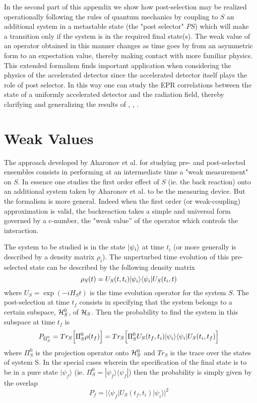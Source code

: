 \documentclass[12pt,oneside]{report}
\def\ket#1{|#1\rangle}
\def\bra#1{\langle #1|}
\newcommand{\bi}{\mbox{$ \bra{\psi_i} $}}
\begin{document}
In the second part of this appendix we show 
how  post-selection may be realized operationally following the rules of
quantum mechanics by coupling to $S$
an additional system in a metastable
state   (the "post selector" $PS$) which will make a transition only if the
system is in the required  final state(s).
The weak value of an operator obtained in this manner changes as time goes by
from an asymmetric form to an expectation value, thereby making contact with
more familiar physics. This extended formalism finds important application when
considering the physics of the accelerated detector since the accelerated
detector itself plays the role of post selector. In this way one can study the 
EPR correlations between the state of a uniformly accelerated detector and the
radiation field, thereby clarifying and generalizing the results of
\cite{UnWa}, \cite{AuMu}, \cite{Grow}.

\section{Weak Values}
The approach developed by
Aharonov et al.\cite{Ahar} for studying pre- and post-selected
ensembles
consists in performing at an intermediate time a "weak measurement"
on $S$. In
essence one studies the first order 
effect of $S$ (ie. the back reaction) onto an
additional system
taken  by Aharonov et al. to be the measuring device. But the formalism is
more general. Indeed
when the first order (or weak-coupling)  approximation is
valid, the backreaction takes a simple and universal form governed by  a
c-number, the "weak value'' of the operator which controls the interaction.


The system to be studied is in the state $\ki$ at
time $t_i$ (or 
 more generally is described by a density matrix $\rho_i$).
The unperturbed time
evolution of this pre-selected state
 can be described by the following density matrix
\begin{equation} \rho_S(t) = U_S(t,t_i)\ki \bi U_S(t_i,t) \label{weaki}
\end{equation}  where $U_S = \exp (- i H_S t)$ is the time evolution operator
for the system $S$. The post-selection at time $t_f$ consists in specifying
that the system belongs to a certain subspace, ${\cal H}_S^{0}$, of
${\cal H}_S$.
Then the probability to find the system in
this subspace at time $t_f$ is \begin{equation}
P_{\Pi_S^{0}} = Tr_S \Bigl [ \Pi_S^{0} \rho(t_f) \Bigr] = Tr_S \Bigl[
\Pi_S^{0} U_S(t_f,t_i)\ki \bi U_S(t_i,t_f) \Bigr] \label{weakii}
\end{equation}   where
$\Pi_S^{0}$ is the projection operator onto ${\cal H}_S^0$ and $Tr_S$ is
the trace over the states of system S. 
In the special cases wherein the specification 
of the final state is to be in a pure state $\ket{\psi_f}$ (ie. 
$\Pi_S^0=\ket{\psi_f}\bra{\psi_f}$)
then the probability is simply given by the overlap 
\begin{equation}
P_{f}= \vert \bra{\psi_f} U_S(t_f,t_i)\ket{\psi_i}\vert^2
\end{equation}
\end{document}
